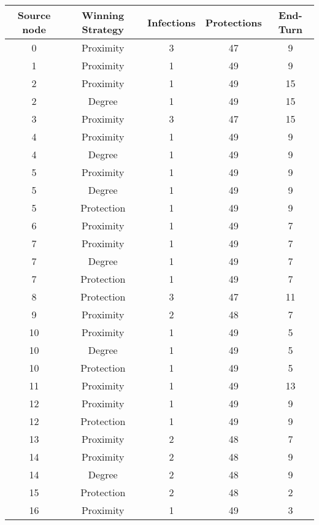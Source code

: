 \documentclass[results.tex]{subfiles}
\begin{document}
\begin{center}
  \begin{tabular}{| c || c | c | c | c |}
    \hline
    {\bfseries Source node} & {\bfseries Winning Strategy} & {\bfseries Infections} & {\bfseries Protections} & {\bfseries End-Turn} \\  %
    \hline\hline
    0 & Proximity & 3 & 47 & 9 \\ 
    \hline
    1 & Proximity & 1 & 49 & 9 \\ 
    \hline
    2 & Proximity & 1 & 49 & 15 \\ 
    \hline
    2 & Degree & 1 & 49 & 15 \\ 
    \hline
    3 & Proximity & 3 & 47 & 15 \\ 
    \hline
    4 & Proximity & 1 & 49 & 9 \\ 
    \hline
    4 & Degree & 1 & 49 & 9 \\ 
    \hline
    5 & Proximity & 1 & 49 & 9 \\ 
    \hline
    5 & Degree & 1 & 49 & 9 \\ 
    \hline
    5 & Protection & 1 & 49 & 9 \\ 
    \hline
    6 & Proximity & 1 & 49 & 7 \\ 
    \hline
    7 & Proximity & 1 & 49 & 7 \\ 
    \hline
    7 & Degree & 1 & 49 & 7 \\ 
    \hline
    7 & Protection & 1 & 49 & 7 \\ 
    \hline
    8 & Protection & 3 & 47 & 11 \\ 
    \hline
    9 & Proximity & 2 & 48 & 7 \\ 
    \hline
    10 & Proximity & 1 & 49 & 5 \\ 
    \hline
    10 & Degree & 1 & 49 & 5 \\ 
    \hline
    10 & Protection & 1 & 49 & 5 \\ 
    \hline
    11 & Proximity & 1 & 49 & 13 \\ 
    \hline
    12 & Proximity & 1 & 49 & 9 \\ 
    \hline
    12 & Protection & 1 & 49 & 9 \\ 
    \hline
    13 & Proximity & 2 & 48 & 7 \\ 
    \hline
    14 & Proximity & 2 & 48 & 9 \\ 
    \hline
    14 & Degree & 2 & 48 & 9 \\ 
    \hline
    15 & Protection & 2 & 48 & 2 \\ 
    \hline
    16 & Proximity & 1 & 49 & 3 \\ 

\end{tabular}
\end{center}
\end{document}
